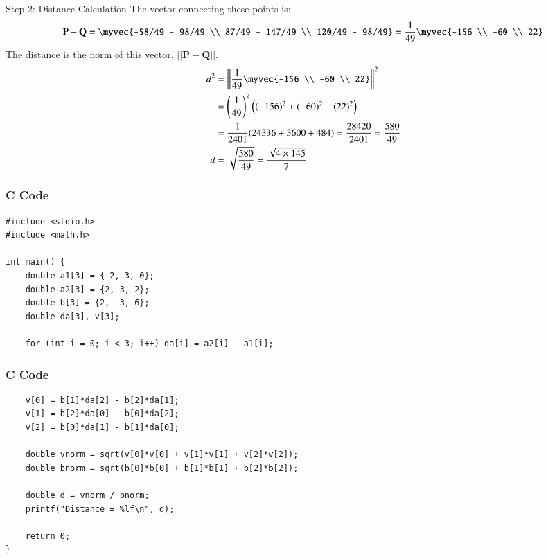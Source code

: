 \documentclass{beamer}
\newcommand{\mat}[1]{\mathbf{#1}}
\begin{document}
\begin{frame}{Step 2: Distance Calculation}
The vector connecting these points is:
\begin{align}
\mat{P}-\mat{Q} = \myvec{-58/49 - 98/49 \\ 87/49 - 147/49 \\ 120/49 - 98/49} = \frac{1}{49}\myvec{-156 \\ -60 \\ 22}
\end{align}
The distance is the norm of this vector, $||\mat{P}-\mat{Q}||$.
\begin{align}
d^2 &= \left\|\frac{1}{49}\myvec{-156 \\ -60 \\ 22}\right\|^2 \nonumber \\
&= \left(\frac{1}{49}\right)^2 \left( (-156)^2 + (-60)^2 + (22)^2 \right) \nonumber \\
&= \frac{1}{2401} (24336 + 3600 + 484) = \frac{28420}{2401} = \frac{580}{49} \\
d &= \sqrt{\frac{580}{49}} = \frac{\sqrt{4 \times 145}}{7}
\end{align}
\end{frame}

\begin{frame}[fragile]
    \frametitle{C Code}
    \begin{lstlisting}
#include <stdio.h>
#include <math.h>

int main() {
    double a1[3] = {-2, 3, 0};
    double a2[3] = {2, 3, 2};
    double b[3] = {2, -3, 6};
    double da[3], v[3];

    for (int i = 0; i < 3; i++) da[i] = a2[i] - a1[i];
    \end{lstlisting}
\end{frame}

\begin{frame}[fragile]
\frametitle{C Code}
   \begin{lstlisting}
    v[0] = b[1]*da[2] - b[2]*da[1];
    v[1] = b[2]*da[0] - b[0]*da[2];
    v[2] = b[0]*da[1] - b[1]*da[0];

    double vnorm = sqrt(v[0]*v[0] + v[1]*v[1] + v[2]*v[2]);
    double bnorm = sqrt(b[0]*b[0] + b[1]*b[1] + b[2]*b[2]);

    double d = vnorm / bnorm;
    printf("Distance = %lf\n", d);

    return 0;
}
    \end{lstlisting}
\end{frame}
\end{document}
